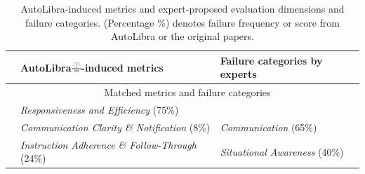 \documentclass[../main.tex]{subfiles}
\begin{document}
\begin{table}[p]
	\centering
	\renewcommand{\arraystretch}{1.2} %
    \small
    \caption{AutoLibra-induced metrics and expert-proposed
	evaluation dimensions and failure categories. (Percentage \%) denotes failure frequency or score from AutoLibra or
	the original papers.}
	\begin{tabular}{@{}lp{}p{}@{}}
		\toprule                                                                                          & \textbf{AutoLibra\protect\includegraphics[height=1em]{figs/scale.png}-induced metrics}                                                                                                                                                        & \textbf{Failure categories by experts}                                    \\
		\midrule \multirow{11}{*}{\rotatebox[origin=c]{90}{\textbf{CoGym} \citep{shao2024collaborative}}} & \multicolumn{2}{c}{Matched metrics and failure categories}                                                                                                                                                                                     \\
		\cmidrule(lr){2-3}                                                                                & \cellcolor{comm}\textit{Responsiveness and Efficiency} (75\%)                                                                                                                                                                                 & \cellcolor{comm}                                                          \\
		                                                                                                  & \cellcolor{comm}\textit{Communication Clarity \& Notification} (8\%)                                                                                                                                                                          & \multirow{-2}{*}{\cellcolor{comm}\textit{Communication} (65\%)}           \\
		                                                                                                  & \cellcolor{sit}\textit{Instruction Adherence \& Follow-Through} (24\%)                                                                                                                                                                        & \cellcolor{sit}\textit{Situational Awareness} (40\%)                      \\

\end{tabular}
\end{table}
\end{document}
